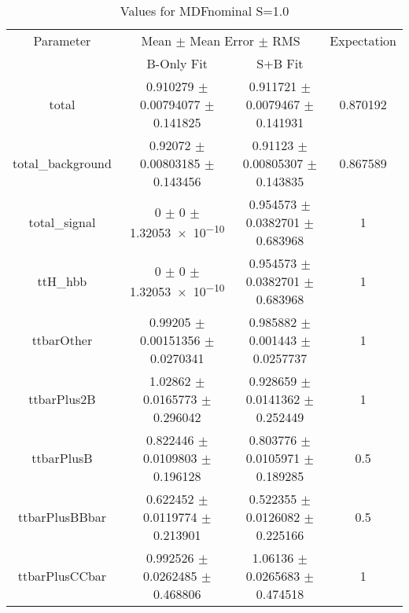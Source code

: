 \begin{table}
\centering
\caption{Values for MDFnominal S=1.0}
\begin{tabular}{cccc}
\toprule
Parameter & \multicolumn{2}{c}{Mean $\pm$ Mean Error $\pm$ RMS} & Expectation\\
 & B-Only Fit & S+B Fit & \\
\midrule
total & \num{0.910279} $\pm$ \num{0.00794077} $\pm$ \num{0.141825} & \num{0.911721} $\pm$ \num{0.0079467} $\pm$ \num{0.141931} & \num{0.870192}\\
total\_background & \num{0.92072} $\pm$ \num{0.00803185} $\pm$ \num{0.143456} & \num{0.91123} $\pm$ \num{0.00805307} $\pm$ \num{0.143835} & \num{0.867589}\\
total\_signal & \num{0} $\pm$ \num{0} $\pm$ \num{1.32053e-10} & \num{0.954573} $\pm$ \num{0.0382701} $\pm$ \num{0.683968} & \num{1}\\
ttH\_hbb & \num{0} $\pm$ \num{0} $\pm$ \num{1.32053e-10} & \num{0.954573} $\pm$ \num{0.0382701} $\pm$ \num{0.683968} & \num{1}\\
ttbarOther & \num{0.99205} $\pm$ \num{0.00151356} $\pm$ \num{0.0270341} & \num{0.985882} $\pm$ \num{0.001443} $\pm$ \num{0.0257737} & \num{1}\\
ttbarPlus2B & \num{1.02862} $\pm$ \num{0.0165773} $\pm$ \num{0.296042} & \num{0.928659} $\pm$ \num{0.0141362} $\pm$ \num{0.252449} & \num{1}\\
ttbarPlusB & \num{0.822446} $\pm$ \num{0.0109803} $\pm$ \num{0.196128} & \num{0.803776} $\pm$ \num{0.0105971} $\pm$ \num{0.189285} & \num{0.5}\\
ttbarPlusBBbar & \num{0.622452} $\pm$ \num{0.0119774} $\pm$ \num{0.213901} & \num{0.522355} $\pm$ \num{0.0126082} $\pm$ \num{0.225166} & \num{0.5}\\
ttbarPlusCCbar & \num{0.992526} $\pm$ \num{0.0262485} $\pm$ \num{0.468806} & \num{1.06136} $\pm$ \num{0.0265683} $\pm$ \num{0.474518} & \num{1}\\
\bottomrule
\end{tabular}
\end{table}